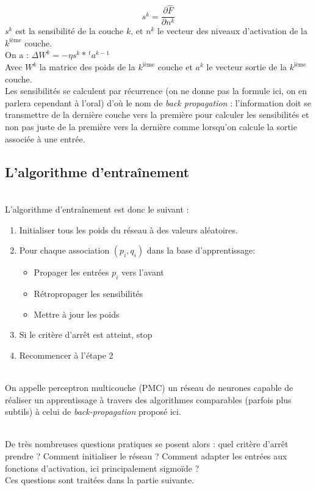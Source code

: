 \documentclass[a4paper, 11pt]{article}
\begin{document}
$$ s^k = \frac{\partial \hat{F} }{\partial{n^k}}$$
$s^k$ est la sensibilité de la couche $k$, et $n^k$ le vecteur des niveaux d'activation de la $k^{\text{ième}}$ couche.
\\
\noident On a : $\Delta W^k = -\eta s^k * \,^t a^{k-1}$
\\ Avec $W^k$ la matrice des poids de la $k^{\text{ième}}$ couche et $a^k$ le vecteur sortie de la $k^{\text{ième}}$ couche.
\\Les sensibilités se calculent par récurrence (on ne donne pas la formule ici, on en parlera cependant à l'oral) d'où le nom de \emph{back propagation} : l'information doit se transmettre de la dernière couche vers la première pour calculer les sensibilités et non pas juste de la première vers la dernière comme lorsqu'on calcule la sortie associée à une entrée.

\subsection{L'algorithme d'entraînement}

\\ L'algorithme d'entraînement est donc le suivant : 

\begin{enumerate}

\item Initialiser tous les poids du réseau à des valeurs aléatoires.
\item Pour chaque association $(p_i,q_i)$ dans la base d’apprentissage:
\begin{itemize}
	\item Propager les entrées $p_i$ vers l'avant
	\item Rétropropager les sensibilités
	\item Mettre à jour les poids
\end{itemize}
\item Si le critère d'arrêt est atteint, stop
\item Recommencer à l'étape 2
\end{enumerate}


\\On appelle perceptron multicouche (PMC) un réseau de neurones capable de réaliser un apprentissage à travers des algorithmes comparables (parfois plus subtils) à celui de \emph{back-propagation} proposé ici.

\\De très nombreuses questions pratiques se posent alors : quel critère d'arrêt prendre ? Comment initialiser le réseau ? Comment adapter les entrées aux fonctions d'activation, ici principalement sigmoïde ?
\\Ces questions sont traitées dans la partie suivante.
\end{document}
